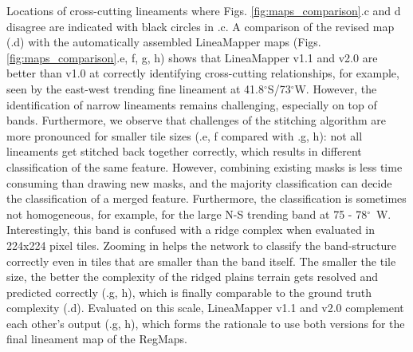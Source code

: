 Locations of cross-cutting lineaments where Figs. \ref{fig:maps_comparison}.c and d disagree are indicated with black circles in .c. A comparison of the revised map (.d) with the automatically assembled LineaMapper maps (Figs. \ref{fig:maps_comparison}.e, f, g, h) shows that LineaMapper v1.1 and v2.0 are better than v1.0 at correctly identifying cross-cutting relationships, for example, seen by the east-west trending fine lineament at 41.8$^{\circ}$S/73$^{\circ}$W. However, the identification of narrow lineaments remains challenging, especially on top of bands.
Furthermore, we observe that challenges of the stitching algorithm are more pronounced for smaller tile sizes (.e, f compared with .g, h): not all lineaments get stitched back together correctly, which results in different classification of the same feature. However, combining existing masks is less time consuming than drawing new masks, and the majority classification can decide the classification of a merged feature. 
Furthermore, the classification is sometimes not homogeneous, for example, for the large N-S trending band at 75 - 78$^{\circ}$~W. Interestingly, this band is confused with a ridge complex when evaluated in 224x224 pixel tiles. Zooming in helps the network to classify the band-structure correctly even in tiles that are smaller than the band itself. The smaller the tile size, the better the complexity of the ridged plains terrain gets resolved and predicted correctly (.g, h), which is finally comparable to the ground truth complexity (.d). Evaluated on this scale, LineaMapper v1.1 and v2.0 complement each other's output (.g, h), which forms the rationale to use both versions for the final lineament map of the RegMaps.


